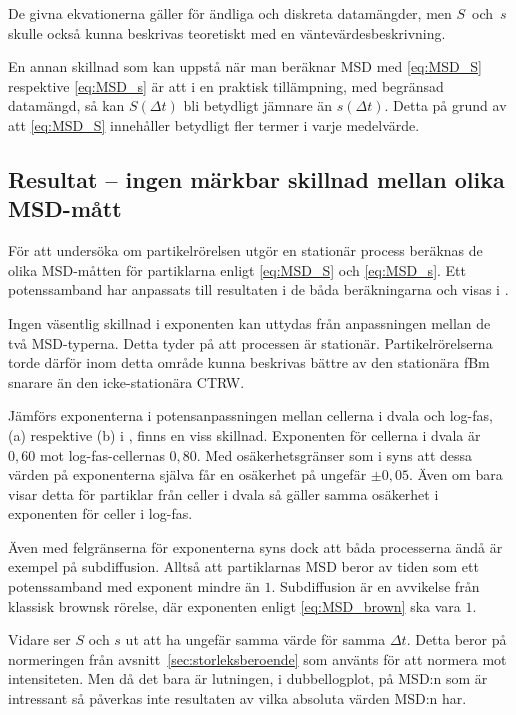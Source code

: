De givna ekvationerna gäller för ändliga och diskreta datamängder, men $S$~och~$s$ skulle också kunna beskrivas teoretiskt med en väntevärdesbeskrivning.

En annan skillnad som kan uppstå när man beräknar MSD med \eqref{eq:MSD_S} respektive \eqref{eq:MSD_s} är att i en praktisk tillämpning, med begränsad datamängd, så kan $S(\Delta{t})$ bli betydligt jämnare än $s(\Delta{t})$. Detta på grund av att \eqref{eq:MSD_S} innehåller betydligt fler termer i varje medelvärde. 



\subsection{Resultat -- ingen märkbar skillnad mellan olika MSD-mått}


För att undersöka om partikelrörelsen utgör en stationär process beräknas de olika MSD-måtten för partiklarna enligt \eqref{eq:MSD_S} och \eqref{eq:MSD_s}. Ett potenssamband har anpassats till resultaten i de båda beräkningarna och visas i . 

Ingen väsentlig skillnad i exponenten kan uttydas från anpassningen mellan de två MSD-typerna. Detta tyder på att processen är stationär. Partikelrörelserna torde därför inom detta område kunna beskrivas bättre av den stationära fBm snarare än den icke-stationära CTRW.

Jämförs exponenterna i potensanpassningen mellan cellerna i dvala och log-fas, (a) respektive (b) i , finns en viss skillnad. Exponenten för cellerna i dvala är $0,60$ mot log-fas-cellernas $0,80$. Med osäkerhetsgränser som i  syns att dessa värden på exponenterna själva får en osäkerhet på ungefär $\pm 0,05$. Även om  bara visar detta för partiklar från celler i dvala så gäller samma osäkerhet i exponenten för celler i log-fas.

Även med felgränserna för exponenterna syns dock att båda processerna ändå är exempel på subdiffusion. Alltså att partiklarnas MSD beror av tiden som ett potenssamband med exponent mindre än $1$. Subdiffusion är en avvikelse från klassisk brownsk rörelse, där exponenten enligt \eqref{eq:MSD_brown} ska vara $1$. 


Vidare ser $S$ och $s$ ut att ha ungefär samma värde för samma $\Delta{t}$. Detta beror på normeringen från avsnitt~\ref{sec:storleksberoende} som använts för att normera mot intensiteten. Men då det bara är lutningen, i dubbellogplot, på MSD:n som är intressant så påverkas inte resultaten av vilka absoluta värden MSD:n har.


